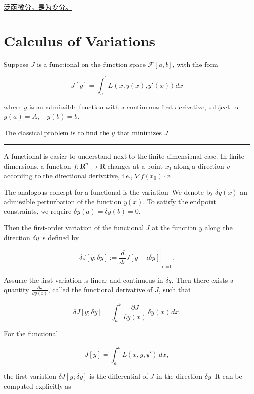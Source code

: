 \href{https://www.cnblogs.com/qizhou/p/18564508}{泛函微分，是为变分。}

\section{Calculus of Variations}

Suppose \(J\) is a functional on the function space \(\mathcal{F}[a,b]\), with the form

\[
J[y] = \int_{a}^{b}L(x,y(x),y'(x))dx \tag{1}
\]

where \(y\) is an admissible function with a continuous first derivative, subject to \(y(a)=A, \quad y(b)=b\).

The classical problem is to find the \(y\) that minimizes \(J\).

\hrule

A functional is easier to understand next to the finite-dimensional case.
In finite dimensions, a function \(f:\mathbf{R}^n \to \mathbf{R}\) changes at a point \(x_0\) along a direction \(v\) according to the directional derivative, i.e.,
\(\nabla f(x_0)\cdot v\).

The analogous concept for a functional is the variation. We denote by \(\delta y(x)\) an admissible perturbation of the function \(y(x)\). To satisfy the endpoint constraints, we require \(\delta y(a)=\delta y(b)=0\).

Then the first-order variation of the functional \(J\) at the function \(y\) along the direction \(\delta y\) is defined by

\[
\delta J[y;\delta y]:=\left.\frac{d}{d\epsilon}J[y+\epsilon\delta y]\right|_{\epsilon=0}. \tag{2}
\]

Assume the first variation is linear and continuous in \(\delta y\).
Then there exists a quantity \(\frac{\partial J}{\partial y(x)}\), called the functional derivative of \(J\), such that

\[
\delta J[y;\delta y]=\int_a^b \frac{\partial J}{\partial y(x)}\,\delta y(x)\,dx. \tag{3}
\]

For the functional

\[
J[y]=\int_a^b L(x,y,y')\,dx,
\]

the first variation \(\delta J[y;\delta y]\) is the differential of \(J\) in the direction \(\delta y\). It can be computed explicitly as

